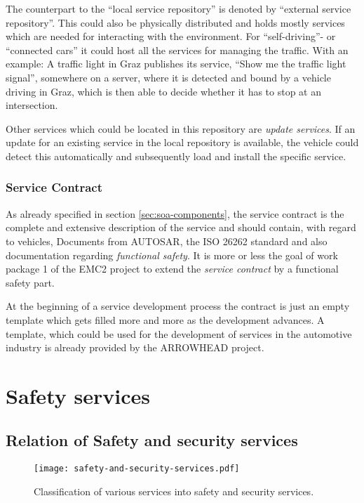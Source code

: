 The counterpart to the ``local service repository'' is denoted by ``external service repository''. This could also be physically distributed and holds mostly services which are needed for interacting with the environment. For ``self-driving''- or ``connected cars'' it could host all the services for managing the traffic. With an example: A traffic light in Graz publishes its service, ``Show me the traffic light signal'', somewhere on a server, where it is detected and bound by a vehicle driving in Graz, which is then able to decide whether it has to stop at an intersection.

Other services which could be located in this repository are \emph{update services}. If an update for an existing service in the local repository is available, the vehicle could detect this automatically and subsequently load and install the specific service.


\subsubsection*{Service Contract}

As already specified in section \ref{sec:soa-components}, the service contract is the complete and extensive description of the service and should contain, with regard to vehicles, Documents from AUTOSAR, the ISO 26262 standard and also documentation regarding \emph{functional safety}. It is more or less the goal of work package 1 of the EMC2 project to extend the \emph{service contract} by a functional safety part.

At the beginning of a service development process the contract is just an empty template which gets filled more and more as the development advances. A template, which could be used for the development of services in the automotive industry is already provided by the ARROWHEAD project.







\section{Safety services}

\subsection{Relation of Safety and security services}

\begin{figure}[ht]
\centering
\caption{Classification of various services into safety and security services.}
\label{fig:safety-and-security-services}
\texttt{[image: safety-and-security-services.pdf]}
\end{figure}

